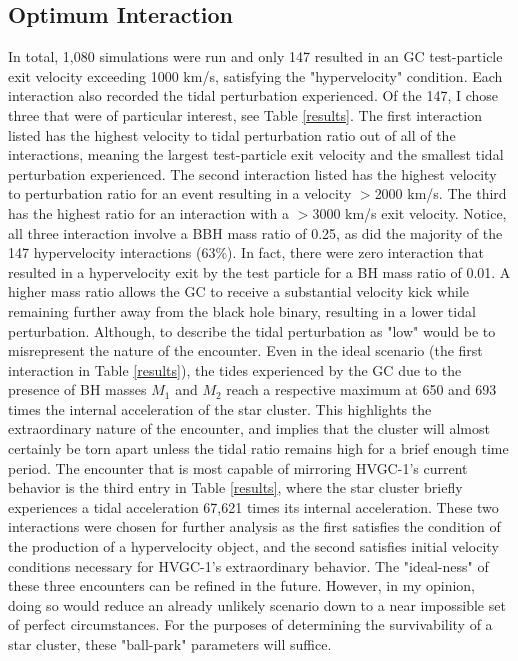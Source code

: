 \documentclass{aastex62}
\begin{document}
\subsection{Optimum Interaction}
In total, 1,080 simulations were run and only 147 resulted in an GC test-particle exit velocity exceeding 1000 km/s, satisfying the "hypervelocity" condition. Each interaction also recorded the tidal perturbation experienced. Of the 147, I chose three that were of particular interest, see Table \ref{results}. The first interaction listed has the highest velocity to tidal perturbation ratio out of all of the interactions, meaning the largest test-particle exit velocity and the smallest tidal perturbation experienced. The second interaction listed has the highest velocity to perturbation ratio for an event resulting in a velocity $>$2000 km/s. The third has the highest ratio for an interaction with a $>$3000 km/s exit velocity. Notice, all three interaction involve a BBH mass ratio of 0.25, as did the majority of the 147 hypervelocity interactions (63$\%$). In fact, there were zero interaction that resulted in a hypervelocity exit by the test particle for a BH mass ratio of 0.01. A higher mass ratio allows the GC to receive a substantial velocity kick while remaining further away from the black hole binary, resulting in a lower tidal perturbation.  Although, to describe the tidal perturbation as "low" would be to misrepresent the nature of the encounter. Even in the ideal scenario (the first interaction in Table \ref{results}), the tides experienced by the GC due to the presence of BH masses $M_{1}$ and $M_{2}$ reach a respective maximum at 650 and 693 times the internal acceleration of the star cluster. This highlights the extraordinary nature of the encounter, and implies that the cluster will almost certainly be torn apart unless the tidal ratio remains high for a brief enough time period. The encounter that is most capable of mirroring HVGC-1's current behavior is the third entry in Table \ref{results}, where the star cluster briefly experiences a tidal acceleration 67,621 times its internal acceleration. These two interactions were chosen for further analysis as the first satisfies the condition of the production of a hypervelocity object, and the second satisfies initial velocity conditions necessary for HVGC-1's extraordinary behavior. The "ideal-ness" of these three encounters can be refined in the future. However, in my opinion, doing so would reduce an already unlikely scenario down to a near impossible set of perfect circumstances. For the purposes of determining the survivability of a star cluster, these "ball-park" parameters will suffice. 
\end{document}

